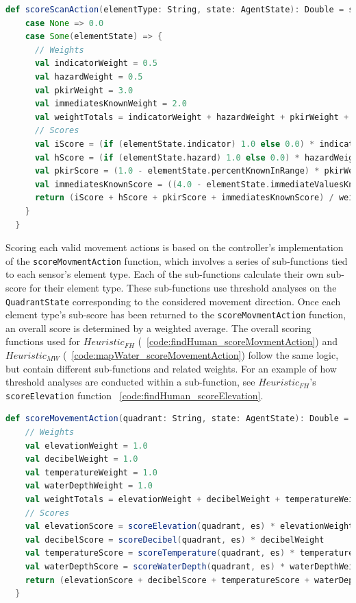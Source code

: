 \begin{lstlisting}[language=Scala, label=code:scoreScanAction]
  def scoreScanAction(elementType: String, state: AgentState): Double = state.getElementState(elementType) match {
    case None => 0.0
    case Some(elementState) => {
      // Weights
      val indicatorWeight = 0.5
      val hazardWeight = 0.5
      val pkirWeight = 3.0
      val immediatesKnownWeight = 2.0
      val weightTotals = indicatorWeight + hazardWeight + pkirWeight + immediatesKnownWeight
      // Scores
      val iScore = (if (elementState.indicator) 1.0 else 0.0) * indicatorWeight
      val hScore = (if (elementState.hazard) 1.0 else 0.0) * hazardWeight
      val pkirScore = (1.0 - elementState.percentKnownInRange) * pkirWeight
      val immediatesKnownScore = ((4.0 - elementState.immediateValuesKnown.toDouble) / 4.0) * immediatesKnownWeight
      return (iScore + hScore + pkirScore + immediatesKnownScore) / weightTotals
    }
  }
\end{lstlisting}

Scoring each valid movement actions is based on the controller's implementation of the \texttt{scoreMovmentAction} function, which involves a series of sub-functions tied to each sensor's element type.
Each of the sub-functions calculate their own sub-score for their element type.
These sub-functions use threshold analyses on the \texttt{QuadrantState} corresponding to the considered movement direction. 
Once each element type's sub-score has been returned to the \texttt{scoreMovmentAction} function, an overall score is determined by a weighted average.
The overall scoring functions used for $Heuristic_{FH}$ (~\ref{code:findHuman_scoreMovmentAction}) and $Heuristic_{MW}$ (~\ref{code:mapWater_scoreMovementAction}) follow the same logic, but contain different sub-functions and related weights.
For an example of how threshold analyses are conducted within a sub-function, see $Heuristic_{FH}$'s \texttt{scoreElevation} function ~\ref{code:findHuman_scoreElevation}.


\begin{lstlisting}[language=Scala, label=code:findHuman_scoreMovmentAction]
  def scoreMovementAction(quadrant: String, state: AgentState): Double = {
    // Weights
    val elevationWeight = 1.0
    val decibelWeight = 1.0
    val temperatureWeight = 1.0
    val waterDepthWeight = 1.0
    val weightTotals = elevationWeight + decibelWeight + temperatureWeight + waterDepthWeight
    // Scores
    val elevationScore = scoreElevation(quadrant, es) * elevationWeight
    val decibelScore = scoreDecibel(quadrant, es) * decibelWeight
    val temperatureScore = scoreTemperature(quadrant, es) * temperatureWeight
    val waterDepthScore = scoreWaterDepth(quadrant, es) * waterDepthWeight
    return (elevationScore + decibelScore + temperatureScore + waterDepthScore) / weightTotals
  }
\end{lstlisting}

